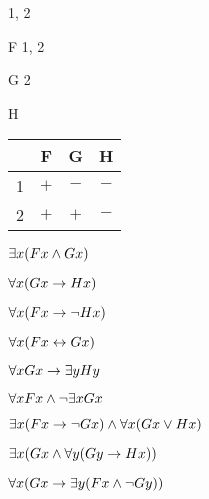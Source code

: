 \begin{minipage}{\textwidth}
\begin{multicols}{2}
	\begin{ekey}
		\item[\text{Domain}] 1, 2
		\item[F] 1, 2
		\item[G] 2
		\item[H]
	\end{ekey}
	
\columnbreak

\begin{tabular}{|c|c|c|c|}
\hline
    &   F   &   G  & H  \\ \hline
1   &   $+$   &   $-$  & $-$  \\ \hline
2   &   $+$   &   $+$ & $-$ \\ \hline
\end{tabular}

\end{multicols}
\end{minipage}



\begin{earg}
\item $\exists x(Fx \wedge Gx)$
\item $\forall x(Gx \rightarrow Hx)$
\item $\forall x(Fx \rightarrow \neg Hx)$
\item $\forall x(Fx \leftrightarrow Gx)$
\item $\forall xGx \rightarrow \exists y Hy$
\item $\forall xFx \wedge \neg \exists xGx$
\item $\exists x(Fx \rightarrow \lnot Gx) \land \forall x(Gx \lor Hx)$
\item $\exists x(Gx \land \forall y(Gy \rightarrow Hx))$
\item $\forall x(Gx \rightarrow \exists y(Fx \wedge \neg Gy))$
\end{earg}



